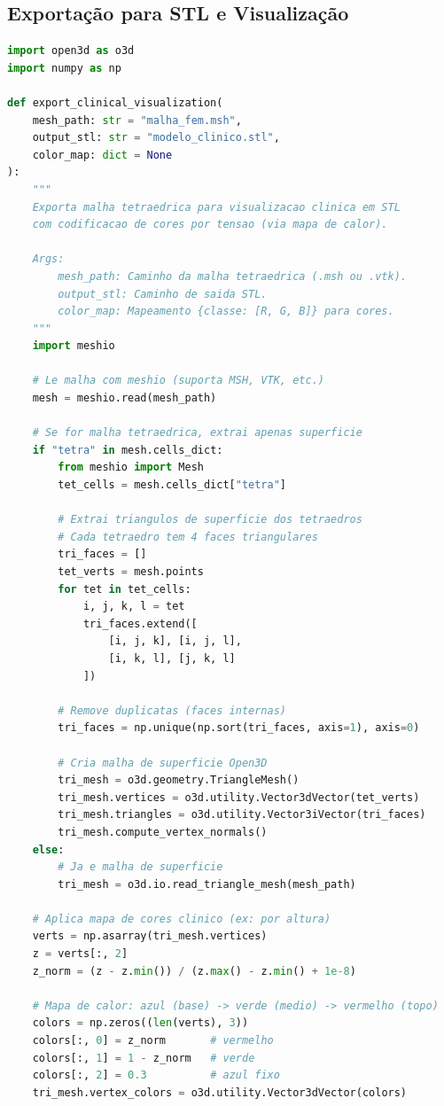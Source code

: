 \subsection{Exportação para STL e Visualização}

\begin{lstlisting}[language=Python, caption={Exportação e visualização clínica da malha}, label={lst:stl_export}]
import open3d as o3d
import numpy as np

def export_clinical_visualization(
    mesh_path: str = "malha_fem.msh",
    output_stl: str = "modelo_clinico.stl",
    color_map: dict = None
):
    """
    Exporta malha tetraedrica para visualizacao clinica em STL
    com codificacao de cores por tensao (via mapa de calor).
    
    Args:
        mesh_path: Caminho da malha tetraedrica (.msh ou .vtk).
        output_stl: Caminho de saida STL.
        color_map: Mapeamento {classe: [R, G, B]} para cores.
    """
    import meshio
    
    # Le malha com meshio (suporta MSH, VTK, etc.)
    mesh = meshio.read(mesh_path)
    
    # Se for malha tetraedrica, extrai apenas superficie
    if "tetra" in mesh.cells_dict:
        from meshio import Mesh
        tet_cells = mesh.cells_dict["tetra"]
        
        # Extrai triangulos de superficie dos tetraedros
        # Cada tetraedro tem 4 faces triangulares
        tri_faces = []
        tet_verts = mesh.points
        for tet in tet_cells:
            i, j, k, l = tet
            tri_faces.extend([
                [i, j, k], [i, j, l],
                [i, k, l], [j, k, l]
            ])
        
        # Remove duplicatas (faces internas)
        tri_faces = np.unique(np.sort(tri_faces, axis=1), axis=0)
        
        # Cria malha de superficie Open3D
        tri_mesh = o3d.geometry.TriangleMesh()
        tri_mesh.vertices = o3d.utility.Vector3dVector(tet_verts)
        tri_mesh.triangles = o3d.utility.Vector3iVector(tri_faces)
        tri_mesh.compute_vertex_normals()
    else:
        # Ja e malha de superficie
        tri_mesh = o3d.io.read_triangle_mesh(mesh_path)
    
    # Aplica mapa de cores clinico (ex: por altura)
    verts = np.asarray(tri_mesh.vertices)
    z = verts[:, 2]
    z_norm = (z - z.min()) / (z.max() - z.min() + 1e-8)
    
    # Mapa de calor: azul (base) -> verde (medio) -> vermelho (topo)
    colors = np.zeros((len(verts), 3))
    colors[:, 0] = z_norm       # vermelho
    colors[:, 1] = 1 - z_norm   # verde
    colors[:, 2] = 0.3          # azul fixo
    tri_mesh.vertex_colors = o3d.utility.Vector3dVector(colors)
    

\end{lstlisting}
